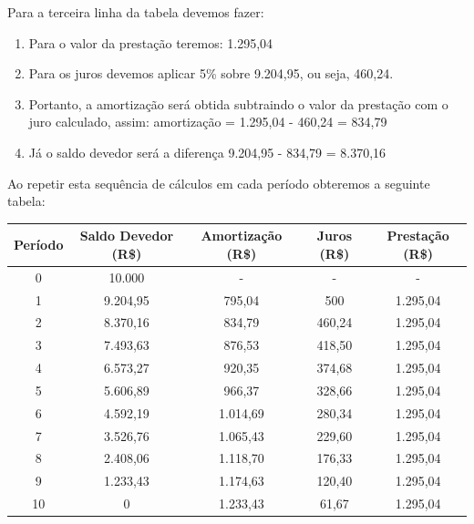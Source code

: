\documentclass[a4paper, 12pt]{article}
\begin{document}
\begin{itemize}
  Para a terceira linha da tabela devemos fazer:\\
  \begin{enumerate}
  \item Para o valor da prestação teremos: 1.295,04
  \item Para os juros devemos aplicar 5\% sobre 9.204,95, ou seja, 460,24.
  \item Portanto, a amortização será obtida subtraindo o valor da prestação com o juro calculado, assim: amortização = 1.295,04 - 460,24 = 834,79
  \item Já o saldo devedor será a diferença 9.204,95 - 834,79 = 8.370,16
  \end{enumerate}
  Ao repetir esta sequência de cálculos em cada período obteremos a seguinte tabela:\\
  \begin{tabular}{ | c | c | c | c | c |}
  \hline
  Período & Saldo Devedor (R\$) & Amortização (R\$) & Juros (R\$) & Prestação (R\$) \\ \hline
  0 & 10.000 & - & - & - \\ \hline
  1 & 9.204,95 & 795,04 & 500 & 1.295,04 \\ \hline  
  2 & 8.370,16 & 834,79 & 460,24 & 1.295,04 \\ \hline  
  3 & 7.493,63 & 876,53 & 418,50 & 1.295,04 \\ \hline  
  4 & 6.573,27 & 920,35 & 374,68 & 1.295,04 \\ \hline  
  5 & 5.606,89 & 966,37 & 328,66 & 1.295,04 \\ \hline  
  6 & 4.592,19 & 1.014,69 & 280,34 & 1.295,04 \\ \hline  
  7 & 3.526,76 & 1.065,43 & 229,60 & 1.295,04 \\ \hline  
  8 & 2.408,06 & 1.118,70 & 176,33 & 1.295,04 \\ \hline  
  9 & 1.233,43 & 1.174,63 & 120,40 & 1.295,04 \\ \hline  
  10 & 0 & 1.233,43 & 61,67 & 1.295,04 \\ \hline  
  \end{tabular} \\\\
  
\end{itemize}
\end{document}
